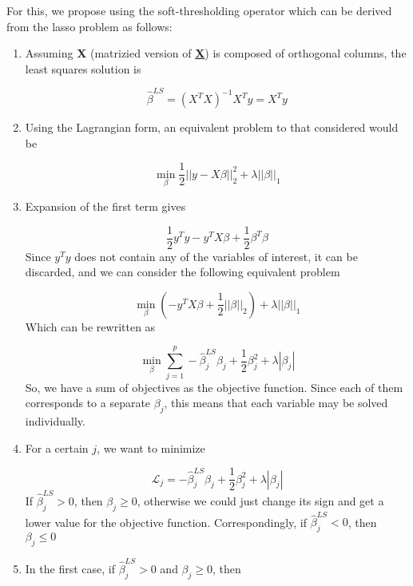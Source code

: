 For this, we propose using the soft-thresholding operator which can be derived from the lasso problem as follows:
\vspace{15pt}
\begin{enumerate}
    \item Assuming \textbf{X} (matrizied version of \textbf{\underline{X}}) is composed of orthogonal columns, the least squares solution is
    
    \begin{equation}
        \hat{\beta}^{LS}=(X^TX)^{-1}X^Ty=X^Ty
    \end{equation}
    \item Using the Lagrangian form, an equivalent problem to that considered would be
    
    \begin{equation}
        \min_\beta\frac{1}{2}||y-X\beta||^2_2+\lambda||\beta||_1
    \end{equation}
    \item Expansion of the first term gives
    
    \begin{equation}
        \frac{1}{2}y^Ty-y^TX\beta+\frac{1}{2}\beta^T\beta
    \end{equation}
    Since $y^Ty$ does not contain any of the variables of interest, it can be discarded, and we can consider the following equivalent problem
    
    \begin{equation}
        \min_\beta(-y^TX\beta+\frac{1}{2}||\beta||_2)+\lambda||\beta||_1
    \end{equation}
    Which can be rewritten as
    
    \begin{equation}
        \min_\beta \sum_{j=1}^{p}-\hat{\beta}^{LS}_j\beta_j+\frac{1}{2}\beta^2_j+\lambda|\beta_j|
    \end{equation}
    So, we have a sum of objectives as the objective function. Since each of them corresponds to a separate $\beta_j$, this means that each variable may be solved individually.
    \item For a certain $j$, we want to minimize
    
    \begin{equation}
        \mathcal{L}_j = -\hat{\beta}^{LS}_j\beta_j+\frac{1}{2}\beta^2_j+\lambda|\beta_j|
    \end{equation}
    If $\hat{\beta}^{LS}_j > 0$, then $\beta_j \geq 0$, otherwise we could just change its sign and get a lower value for the objective function. Correspondingly, if $\hat{\beta}^{LS}_j < 0$, then $\beta_j \leq 0$
    \item In the first case, if $\hat{\beta}^{LS}_j > 0$ and $\beta_j \geq 0$, then
    

\end{enumerate}
